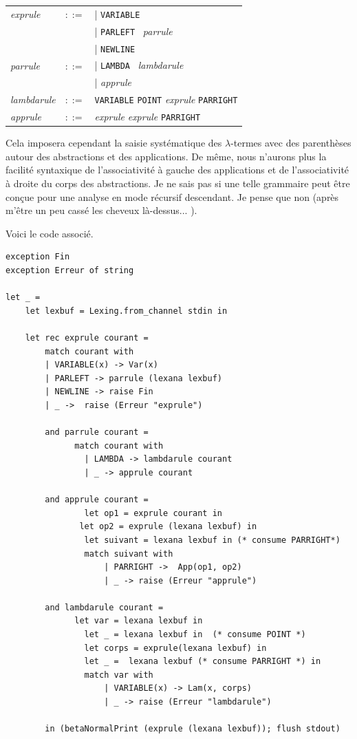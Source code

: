  
\vspace{0.5cm}
\begin{tabular}{lll}
\textit{exprule} & $::=$ & | \texttt{VARIABLE}  \\
					  &	    & | \texttt{PARLEFT} \  \textit{parrule} \\
					  & 		 & | \texttt{NEWLINE} \\
\textit{parrule} & $::=$ & | \texttt{LAMBDA} \ \textit{lambdarule}  \\
					  &       & | \textit{apprule} \\ 
\textit{lambdarule} & $::=$ & \texttt{VARIABLE}  \texttt{POINT}  \textit{exprule}  \texttt{PARRIGHT} \\
\textit{apprule} & $::=$    &  \textit{exprule} \textit{exprule}  \texttt{PARRIGHT} \\
\end{tabular}
\vspace{0.5cm}

Cela imposera cependant la saisie systématique des $\lambda$-termes avec des parenthèses autour des abstractions et des applications.
De même, nous n'aurons plus la facilité syntaxique de l'associativité à gauche des applications et de l'associativité à droite
du corps des abstractions.
Je ne sais pas si une telle grammaire peut être conçue pour une analyse en mode
récursif descendant.
Je pense que non (après m'être un peu cassé les cheveux là-dessus... ). 

Voici le code associé.
\begin{Verbatim}
exception Fin
exception Erreur of string
	
let _ =
	let lexbuf = Lexing.from_channel stdin in
				
	let rec exprule courant =
		match courant with
		| VARIABLE(x) -> Var(x)
		| PARLEFT -> parrule (lexana lexbuf)
		| NEWLINE -> raise Fin
		| _ ->  raise (Erreur "exprule")
		
		and parrule courant =
			  match courant with
				| LAMBDA -> lambdarule courant
				| _ -> apprule courant
		 
		and apprule courant =
				let op1 = exprule courant in
			   let op2 = exprule (lexana lexbuf) in
				let suivant = lexana lexbuf in (* consume PARRIGHT*)
				match suivant with 
					| PARRIGHT ->  App(op1, op2) 
					| _ -> raise (Erreur "apprule")
		 
		and lambdarule courant =
			  let var = lexana lexbuf in 
				let _ = lexana lexbuf in  (* consume POINT *)
				let corps = exprule(lexana lexbuf) in
				let _ =  lexana lexbuf (* consume PARRIGHT *) in
				match var with 
					| VARIABLE(x) -> Lam(x, corps)
					| _ -> raise (Erreur "lambdarule")
			
		in (betaNormalPrint (exprule (lexana lexbuf)); flush stdout)
\end{Verbatim}

